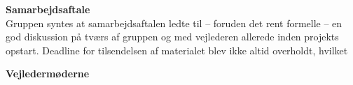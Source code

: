 \textbf{Samarbejdsaftale}\\ %
Gruppen syntes at samarbejdsaftalen ledte til – foruden det rent formelle – en god diskussion på tværs af gruppen og med vejlederen allerede inden projekts opstart. Deadline for tilsendelsen af materialet blev ikke altid overholdt, hvilket 

\textbf{Vejledermøderne}\\ %
